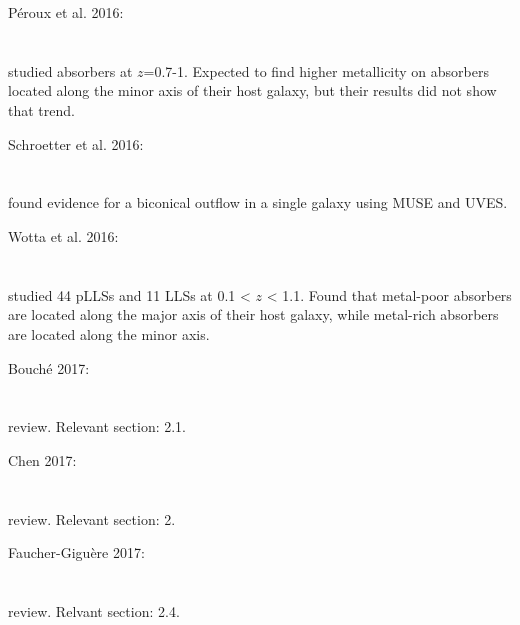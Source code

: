 \hline

Péroux et al. 2016: \\
\citet{2016MNRAS.457..903P} \\
\citep{2016MNRAS.457..903P} \\
studied absorbers at $z$=0.7-1. Expected to find higher metallicity on absorbers
located along the minor axis of their host galaxy, but their results did not
show that trend. \\

\hline

Schroetter et al. 2016: \\
\citet{2016ApJ...833...39S} \\
\citep{2016ApJ...833...39S} \\
found evidence for a biconical outflow in a single galaxy using MUSE and
UVES. \\

\hline

Wotta et al. 2016: \\
\citet{2016ApJ...831...95W} \\
\citep{2016ApJ...831...95W} \\
studied 44 pLLSs and 11 LLSs at 0.1 < $z$ < 1.1. Found that metal-poor absorbers
are located along the major axis of their host galaxy, while metal-rich
absorbers are located along the minor axis. \\

\hline

Bouché 2017: \\
\citet{2017ASSL..430..355B} \\
\citep{2017ASSL..430..355B} \\
review. Relevant section: 2.1. \\

\hline

Chen 2017: \\
\citet{2017ASSL..434..291C} \\
\citep{2017ASSL..434..291C} \\
review. Relevant section: 2. \\

\hline

Faucher-Giguère 2017: \\
\citet{2017ASSL..430..271F} \\
\citep{2017ASSL..430..271F} \\
review. Relvant section: 2.4. \\

\hline

